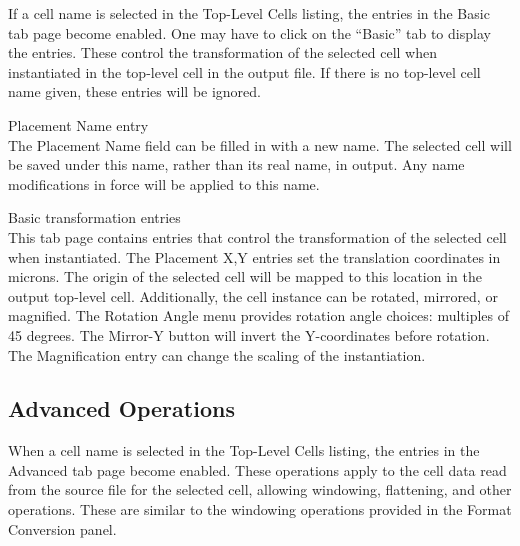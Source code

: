 If a cell name is selected in the {\cb Top-Level Cells} listing, the
entries in the {\cb Basic} tab page become enabled.  One may have to
click on the ``Basic'' tab to display the entries.  These control the
transformation of the selected cell when instantiated in the top-level
cell in the output file.  If there is no top-level cell name given,
these entries will be ignored.

\begin{description}
\item{{\cb Placement Name} entry}\\
The {\cb Placement Name} field can be filled in with a new name.  The
selected cell will be saved under this name, rather than its real
name, in output.  Any name modifications in force will be applied to
this name.

\item{{\cb Basic} transformation entries}\\
This tab page contains entries that control the transformation of the
selected cell when instantiated.  The {\cb Placement X,Y} entries set
the translation coordinates in microns.  The origin of the selected
cell will be mapped to this location in the output top-level cell. 
Additionally, the cell instance can be rotated, mirrored, or
magnified.  The {\cb Rotation Angle} menu provides rotation angle
choices:  multiples of 45 degrees.  The {\cb Mirror-Y} button will
invert the Y-coordinates before rotation.  The {\cb Magnification}
entry can change the scaling of the instantiation.
\end{description}

\subsection{Advanced Operations}

When a cell name is selected in the {\cb Top-Level Cells} listing, the
entries in the {\cb Advanced} tab page become enabled.  These
operations apply to the cell data read from the source file for the
selected cell, allowing windowing, flattening, and other operations. 
These are similar to the windowing operations provided in the {\cb
Format Conversion} panel.


